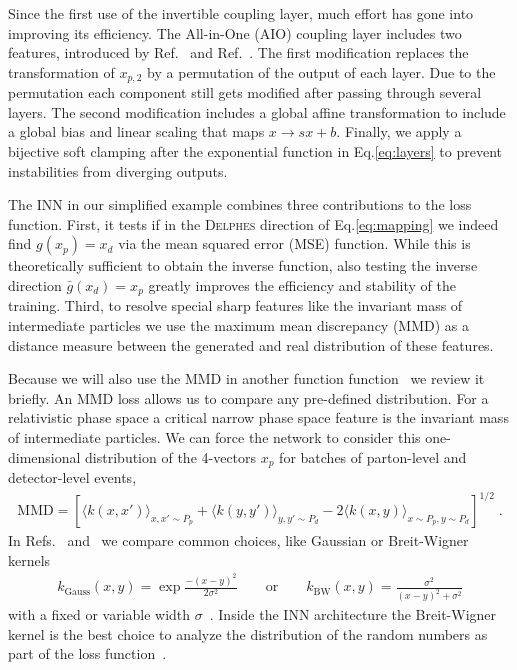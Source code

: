 Since the first use of the invertible coupling layer, much effort has
gone into improving its efficiency. The All-in-One (AIO) coupling
layer includes two features, introduced by Ref.~\cite{coupling2} and
Ref.~\cite{glow}. The first modification replaces the transformation
of $x_{p,2}$ by a permutation of the output of each layer. Due to the
permutation each component still gets modified after passing through
several layers. The second modification includes a global affine transformation
to include a global bias and linear scaling that maps $x \rightarrow s
x + b$. Finally, we apply a bijective soft clamping after the
exponential function in Eq.\eqref{eq:layers} to prevent instabilities
from diverging outputs.

The INN in our simplified example combines three contributions to the
loss function. First, it tests if in the \textsc{Delphes} direction of
Eq.\eqref{eq:mapping} we indeed find $g(x_p) = x_d$ via the mean
squared error (MSE) function. While this is theoretically sufficient
to obtain the inverse function, also testing the inverse direction
$\bar{g}(x_d) = x_p$ greatly improves the efficiency and stability of
the training. Third, to resolve special sharp features like the
invariant mass of intermediate particles we use the maximum mean
discrepancy (MMD) as a distance measure between the generated and real
distribution of these features.

Because we will also use the MMD in another function
function~\cite{gan_phasespace} we review it briefly. An MMD loss
allows us to compare any pre-defined distribution. For a relativistic
phase space a critical narrow phase space feature is the invariant
mass of intermediate particles. We can force the network to consider
this one-dimensional distribution of the 4-vectors $x_p$ for batches
of parton-level and detector-level events,
%
\begin{align}
\text{MMD} =
\left[ \langle k\left(x,x'\right)\rangle_{x,x' \sim P_p}
     + \langle k\left(y,y'\right)\rangle_{y,y' \sim P_d}
     - 2 \langle k\left(x,y \right)\rangle_{x\sim P_p,y \sim P_d} \right]^{1/2} \; .
\label{eq:MMD}
\end{align}
%
In Refs.~\cite{gan_phasespace} and~\cite{fcgan} we compare common
choices, like Gaussian or Breit-Wigner kernels
%
\begin{align}
k_\text{Gauss} \left(x,y\right) = \exp \frac{- \left(x - y\right)^2}{2 \sigma^2}
\qquad \text{or} \qquad
k_\text{BW}\left(x,y\right) = \frac{\sigma^2}{\left(x - y\right)^2 + \sigma^2}
\label{eq:kernels}
 \end{align}
%
with a fixed or variable width $\sigma$~\cite{fcgan}.  Inside the INN
architecture the Breit-Wigner kernel is the best choice to analyze the
distribution of the random numbers as part of the loss
function~\cite{inn1}.

